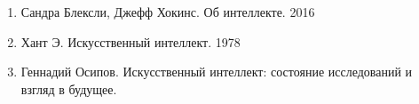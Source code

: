 
\begin{enumerate}
\item{Сандра Блексли, Джефф Хокинс. Об интеллекте. 2016}
\item{Хант Э. Искусственный интеллект. 1978}
\item{Геннадий Осипов. Искусственный интеллект: состояние исследований и взгляд в будущее.}
\end{enumerate}
